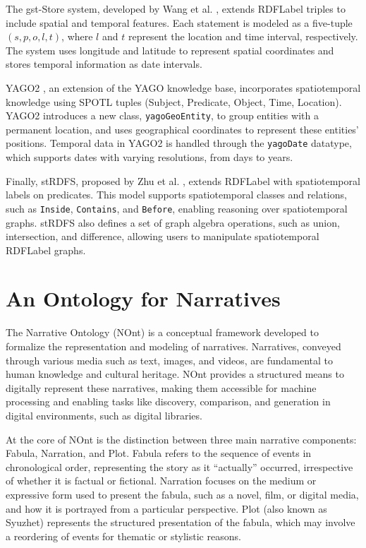 The gst-Store system, developed by Wang et al. \cite{wangGstStoreEngineLarge2014}, extends \acrshort{RDFLabel} triples to include spatial and temporal features. Each statement is modeled as a five-tuple \( (s, p, o, l, t) \), where \( l \) and \( t \) represent the location and time interval, respectively. The system uses longitude and latitude to represent spatial coordinates and stores temporal information as date intervals.

YAGO2 \cite{hoffartYAGO2SpatiallyTemporally2013a}, an extension of the YAGO knowledge base, incorporates spatiotemporal knowledge using SPOTL tuples (Subject, Predicate, Object, Time, Location). YAGO2 introduces a new class, \texttt{yagoGeoEntity}, to group entities with a permanent location, and uses geographical coordinates to represent these entities' positions. Temporal data in YAGO2 is handled through the \texttt{yagoDate} datatype, which supports dates with varying resolutions, from days to years.

Finally, stRDFS, proposed by Zhu et al. \cite{zhuStRDFSSpatiotemporalKnowledge2020}, extends \acrshort{RDFLabel} with spatiotemporal labels on predicates. This model supports spatiotemporal classes and relations, such as \texttt{Inside}, \texttt{Contains}, and \texttt{Before}, enabling reasoning over spatiotemporal graphs. stRDFS also defines a set of graph algebra operations, such as union, intersection, and difference, allowing users to manipulate spatiotemporal \acrshort{RDFLabel} graphs.

\section{An Ontology for Narratives}\label{III-sec:nont}

The Narrative Ontology (NOnt) \cite{meghiniRepresentingNarrativesDigital2021} is a conceptual framework developed to formalize the representation and modeling of narratives. Narratives, conveyed through various media such as text, images, and videos, are fundamental to human knowledge and cultural heritage. NOnt provides a structured means to digitally represent these narratives, making them accessible for machine processing and enabling tasks like discovery, comparison, and generation in digital environments, such as digital libraries.

At the core of NOnt is the distinction between three main narrative components: Fabula, Narration, and Plot. Fabula refers to the sequence of events in chronological order, representing the story as it ``actually'' occurred, irrespective of whether it is factual or fictional. Narration focuses on the medium or expressive form used to present the fabula, such as a novel, film, or digital media, and how it is portrayed from a particular perspective. Plot (also known as Syuzhet) represents the structured presentation of the fabula, which may involve a reordering of events for thematic or stylistic reasons.

